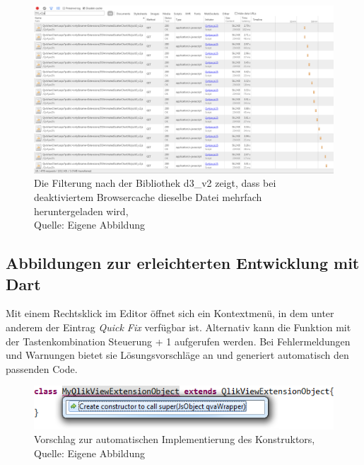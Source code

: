 \begin{appendix}
\begin{figure}[htbp]
	\centering
		\includegraphics[width=1.00\textwidth]{img/headRudundant/Sources.png}
	\caption[Mehrfaches Herunterladen derselben Datei.]{Die Filterung nach der Bibliothek d3\_v2 zeigt, dass bei deaktiviertem Browsercache dieselbe Datei mehrfach heruntergeladen wird, \\Quelle: Eigene Abbildung}
	\label{fig:Sources}
\end{figure}


\newpage
\subsection{Abbildungen zur erleichterten Entwicklung mit Dart} 
\label{lab:AbbildungenZurErleichtertenEntwicklungVonErweiterungenMitDart}

Mit einem Rechtsklick im Editor öffnet sich ein Kontextmenü, in dem unter anderem der Eintrag \textit{Quick Fix} verfügbar ist. Alternativ kann die Funktion mit der Tastenkombination Steuerung + 1 aufgerufen werden. Bei Fehlermeldungen und Warnungen bietet sie Lösungsvorschläge an und generiert automatisch den passenden Code.

\begin{figure}[htbp]
	\centering
		\includegraphics[width=1.00\textwidth]{img/HilfeDurchEditor/implConstr.png}
	\caption[Vorschlag zur automatischen Implementierung des Konstruktors]{Vorschlag zur automatischen Implementierung des Konstruktors, \\Quelle: Eigene Abbildung}
	\label{fig:implConstr}
\end{figure}


\end{appendix}
